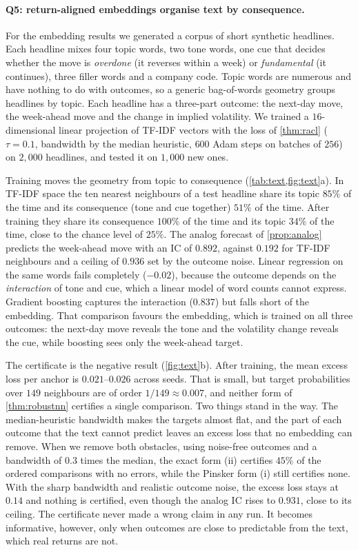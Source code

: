 \documentclass{article}
\theoremstyle{plain}
\theoremstyle{definition}
\theoremstyle{remark}
\begin{document}
\paragraph{Q5: return-aligned embeddings organise text by consequence.}\label{app:text} For the embedding results we generated a corpus of short synthetic headlines. Each headline mixes four topic words, two tone words, one cue that decides whether the move is \emph{overdone} (it reverses within a week) or \emph{fundamental} (it continues), three filler words and a company code. Topic words are numerous and have nothing to do with outcomes, so a generic bag-of-words geometry groups headlines by topic. Each headline has a three-part outcome: the next-day move, the week-ahead move and the change in implied volatility. We trained a $16$-dimensional linear projection of TF-IDF vectors with the loss of \cref{thm:racl} ($\tau=0.1$, bandwidth by the median heuristic, $600$ Adam steps on batches of $256$) on $2{,}000$ headlines, and tested it on $1{,}000$ new ones.

Training moves the geometry from topic to consequence (\cref{tab:text,fig:text}a). In TF-IDF space the ten nearest neighbours of a test headline share its topic $85\%$ of the time and its consequence (tone and cue together) $51\%$ of the time. After training they share its consequence $100\%$ of the time and its topic $34\%$ of the time, close to the chance level of $25\%$. The analog forecast of \cref{prop:analog} predicts the week-ahead move with an IC of $0.892$, against $0.192$ for TF-IDF neighbours and a ceiling of $0.936$ set by the outcome noise. Linear regression on the same words fails completely ($-0.02$), because the outcome depends on the \emph{interaction} of tone and cue, which a linear model of word counts cannot express. Gradient boosting captures the interaction ($0.837$) but falls short of the embedding. That comparison favours the embedding, which is trained on all three outcomes: the next-day move reveals the tone and the volatility change reveals the cue, while boosting sees only the week-ahead target.

The certificate is the negative result (\cref{fig:text}b). After training, the mean excess loss per anchor is $0.021$--$0.026$ across seeds. That is small, but target probabilities over $149$ neighbours are of order $1/149\approx0.007$, and neither form of \cref{thm:robustnn} certifies a single comparison. Two things stand in the way. The median-heuristic bandwidth makes the targets almost flat, and the part of each outcome that the text cannot predict leaves an excess loss that no embedding can remove. When we remove both obstacles, using noise-free outcomes and a bandwidth of $0.3$ times the median, the exact form (ii) certifies $45\%$ of the ordered comparisons with no errors, while the Pinsker form (i) still certifies none. With the sharp bandwidth and realistic outcome noise, the excess loss stays at $0.14$ and nothing is certified, even though the analog IC rises to $0.931$, close to its ceiling. The certificate never made a wrong claim in any run. It becomes informative, however, only when outcomes are close to predictable from the text, which real returns are not.
\end{document}
